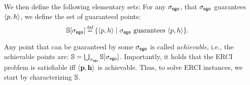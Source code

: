 We then define the following elementary sets: For any ${\sigma_{\mathsf{ego}}}$,
that ${\sigma_{\mathsf{ego}}}$ guarantees $\langle p, h \rangle$, we define
the set of guaranteed points:
\begin{equation}\label{eq:guaranteed}
  \solutions[\pOneSched] \eqdef \{ \langle \scp, \rndp \rangle \mid  \pOneSched \text{ guarantees } \langle \scp, \rndp \rangle \}.
\end{equation}

Any point that can be guaranteed by some ${\sigma_{\mathsf{ego}}}$ is called
\emph{achievable}, i.e., the achievable points are: $ \mathbb{S} =
\bigcup_{{\sigma_{\mathsf{ego}}}} \mathbb{S}[{\sigma_{\mathsf{ego}}}]$.  Importantly, it holds
that the ERCI problem is satisfiable iff $\langle \mathbf{p},
\mathbf{h} \rangle$ is achievable.   Thus, to solve ERCI instances, we start by characterizing
$\mathbb{S}$.


